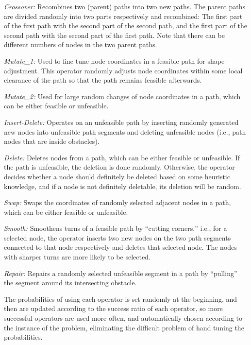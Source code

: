 \begin{description}
\item{\it Crossover:} Recombines two (parent) paths into two new paths. The
parent paths are divided randomly into two parts respectively and recombined:
The first part of the first path with the second part of the second path, and
the first part of the second path with the second part of the first path. Note
that there can be different numbers of nodes in the two parent paths.
\item{\it Mutate\_1:} Used to fine tune node coordinates in a
feasible path for shape adjustment. This operator randomly adjusts node
coordinates within some local clearance of the path so that the path remains
feasible afterwards.
\item{\it Mutate\_2:} Used for large random changes of node coordinates in
a path, which can be either feasible or unfeasible.
\item{\it Insert-Delete:} Operates on an unfeasible path by inserting
randomly generated new nodes into unfeasible path segments and deleting
unfeasible nodes (i.e., path nodes that are inside obstacles).
\item{\it Delete:} Deletes nodes from a path, which can be
either feasible or unfeasible. If the path is unfeasible,
the deletion is done randomly. Otherwise, the operator
decides whether a node should definitely be deleted
based on some heuristic knowledge, and if a node is
not definitely deletable, its deletion will be random.
\item{\it Swap:} Swaps the coordinates of randomly selected
adjacent nodes in a path, which can be either feasible
or unfeasible.
\item{\it Smooth:} Smoothens turns of a feasible path by ``cutting corners,''
i.e., for a selected node, the operator
inserts two new nodes on the two path segments connected to that node
respectively and deletes that selected node. The nodes with sharper turns are
more likely to be selected.
\item{\it Repair:} Repairs a randomly selected unfeasible segment
in a path by ``pulling'' the segment around its
intersecting obstacle.
\end{description}
The probabilities of using each operator is set randomly at the beginning, and
then are updated according to the success ratio of each operator, so more
successful operators are used more often, and automatically chosen according to
the instance of the problem, eliminating the difficult problem of hand tuning
the probabilities.


